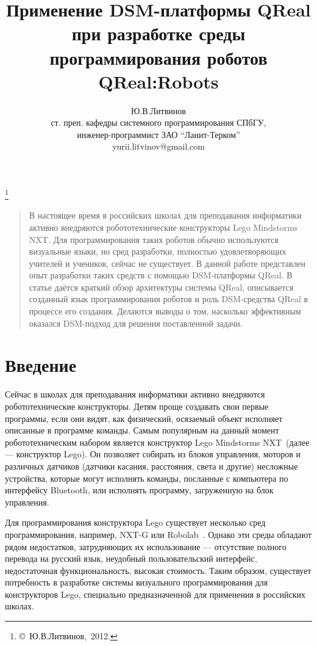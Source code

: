 \documentclass[a4paper]{article}
\title{Применение DSM-платформы QReal при разработке среды программирования роботов QReal:Robots}
\author{Ю.В.Литвинов \\ ст. преп. кафедры системного программирования СПбГУ, \\ инженер-программист ЗАО ``Ланит-Терком'' \\ yurii.litvinov@gmail.com}
\date{}
\begin{document}
\maketitle
\thispagestyle{empty}

\renewcommand{\thefootnote}{}
\footnote{\small{\copyright~Ю.В.Литвинов,~2012.}}
\renewcommand{\thefootnote}{\arabic{footnote}}
\setcounter{footnote}{0}

\begin{quote}
\small\noindent
В настоящее время в российских школах для преподавания информатики активно внедряются робототехнические конструкторы Lego Mindstorms NXT. Для программирования таких роботов обычно используются визуальные языки, но сред разработки, полностью удовлетворяющих  учителей и учеников, сейчас не существует. В данной работе представлен опыт разработки таких средств с помощью DSM-платформы QReal. В статье даётся краткий обзор архитектуры системы QReal, описывается созданный язык программирования роботов и роль DSM-средства QReal в процессе его создания. Делаются выводы о том, насколько эффективным оказался DSM-подход для решения поставленной задачи.
\end{quote}

\section*{Введение}
Сейчас в школах для преподавания информатики активно внедряются робототехнические конструкторы. Детям проще создавать свои первые программы, если они видят, как физический, осязаемый объект исполняет описанные в программе команды. Самым популярным на данный момент робототехническим набором является конструктор Lego Mindstorms NXT~\cite{legoNxt}(далее --- конструктор Lego). Он позволяет собирать из блоков управления, моторов и различных датчиков (датчики касания, расстояния, света и другие) несложные устройства, которые могут исполнять команды, посланные с компьютера по интерфейсу Bluetooth, или исполнять программу, загруженную на блок управления.

Для программирования конструктора Lego существует несколько сред программирования, например, NXT-G или Robolab~\cite{robolabHome}. Однако эти среды обладают рядом недостатков, затрудняющих их использование --- отсутствие полного перевода на русский язык, неудобный пользовательский интерфейс, недостаточная функциональность, высокая стоимость. Таким образом, существует потребность в разработке системы визуального программирования для конструкторов Lego, специально предназначенной для применения в российских школах.
\end{document}
